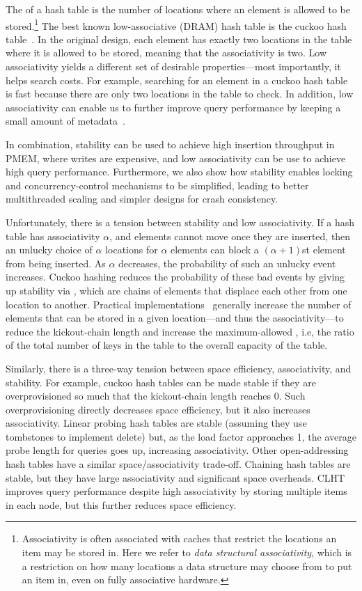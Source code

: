 The  of a hash table is the number of locations where an
element is allowed to be stored.\footnote{Associativity is often associated with
caches that restrict the locations an item may be stored in.  Here we refer to
\emph{data structural associativity}, which is a restriction on how many
locations a data structure may choose from to put an item in, even on fully
associative hardware.} The best known low-associative (DRAM) hash table is the
cuckoo hash table~\cite{Pagh:CuckooHash,PaghRo01}.  In the original design, each
element has exactly two locations in the table where it is allowed to be stored,
meaning that the associativity is two.  Low associativity yields a different set
of desirable properties---most importantly, it helps search costs. For example,
searching for an element in a cuckoo hash table is fast because there are only
two locations in the table to check.  In addition, low associativity can enable
us to further improve query performance by keeping a small amount of metadata~\cite{pandey2022iceberght}.


In combination, stability can be used to achieve high insertion throughput in
PMEM, where writes are expensive, and low associativity can be use to achieve
high query  performance.  Furthermore, we also show how stability enables
locking and concurrency-control mechanisms to be simplified, leading to better
multithreaded scaling and simpler designs for crash consistency.

Unfortunately, there is a tension between stability and low associativity.  If a
hash table has associativity $\alpha$, and elements cannot move once they are
inserted, then an unlucky choice of $\alpha$ locations for $\alpha$ elements can
block a $(\alpha+1)$st element from being inserted.  As $\alpha$ decreases, the
probability of such an unlucky event increases.  Cuckoo hashing reduces the
probability of these bad events by giving up stability via , which are chains of elements that displace each other from one location
to another. Practical implementations~\cite{LiAn14} generally increase the
number of elements that can be stored in a given location---and thus the
associativity---to reduce the kickout-chain length and increase the
maximum-allowed , i.e, the ratio of the total number of keys
in the table to the overall capacity of the table.


Similarly, there is a three-way tension between space efficiency, associativity,
and stability.  For example, cuckoo hash tables can be made stable if they are
overprovisioned so much that the kickout-chain length reaches 0.  Such
overprovisioning directly decreases space efficiency, but it also increases
associativity.  Linear probing hash tables are stable (assuming they use
tombstones to implement delete) but, as the load factor approaches 1, the
average probe length for queries goes up, increasing associativity.  Other
open-addressing hash tables have a similar space/associativity trade-off.
Chaining hash tables are stable, but they have large associativity and
significant space overheads.  CLHT~\cite{david2015asynchronized} improves query
performance despite high associativity by storing multiple items in each node,
but this further reduces space efficiency.

